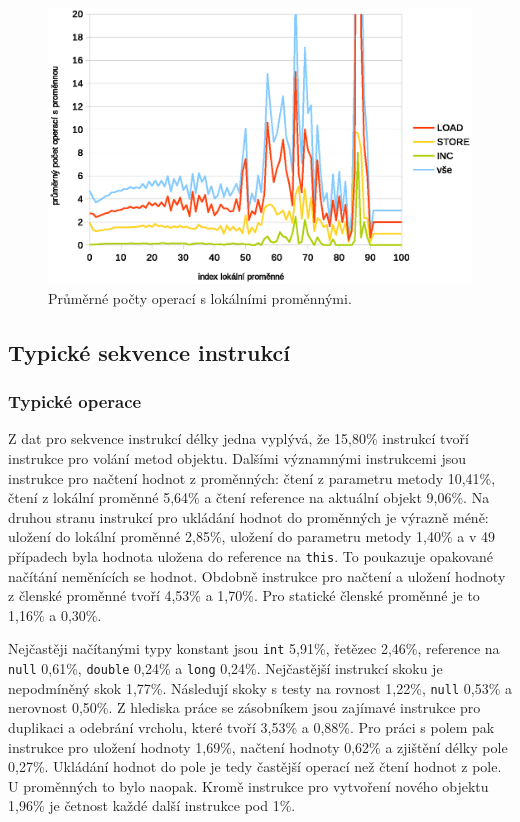 \begin{figure}[h!]
\centering
\includegraphics[scale=0.9]{fig/locals} 
\caption{Průměrné počty operací s lokálními proměnnými.}\label{vars}
\end{figure}

\subsection{Typické sekvence instrukcí}

\subsubsection{Typické operace}

Z dat pro sekvence instrukcí délky jedna vyplývá, že 15,80\% instrukcí tvoří instrukce pro volání metod objektu. Dalšími významnými instrukcemi jsou instrukce pro načtení hodnot z proměnných: čtení z parametru metody 10,41\%, čtení z lokální proměnné 5,64\% a čtení reference na aktuální objekt 9,06\%. Na druhou stranu instrukcí pro ukládání hodnot do proměnných je výrazně méně: uložení do lokální proměnné 2,85\%, uložení do parametru metody 1,40\% a v 49 případech byla hodnota uložena do reference na \texttt{this}. To poukazuje opakované načítání neměnících se hodnot. Obdobně instrukce pro načtení a uložení hodnoty z členské proměnné tvoří 4,53\% a 1,70\%. Pro statické členské proměnné je to 1,16\% a 0,30\%. 

Nejčastěji načítanými typy konstant jsou \texttt{int} 5,91\%, řetězec 2,46\%, reference na \texttt{null} 0,61\%, \texttt{double} 0,24\% a \texttt{long} 0,24\%. Nejčastější instrukcí skoku je nepodmíněný skok 1,77\%. Následují skoky s testy na rovnost 1,22\%, \texttt{null} 0,53\% a nerovnost 0,50\%. Z hlediska práce se zásobníkem jsou zajímavé instrukce pro duplikaci a odebrání vrcholu, které tvoří 3,53\% a 0,88\%. Pro práci s polem pak instrukce pro uložení hodnoty 1,69\%, načtení hodnoty 0,62\% a zjištění délky pole 0,27\%. Ukládání hodnot do pole je tedy častější operací než čtení hodnot z pole. U proměnných to bylo naopak. Kromě instrukce pro vytvoření nového objektu 1,96\% je četnost každé další instrukce pod 1\%. 

